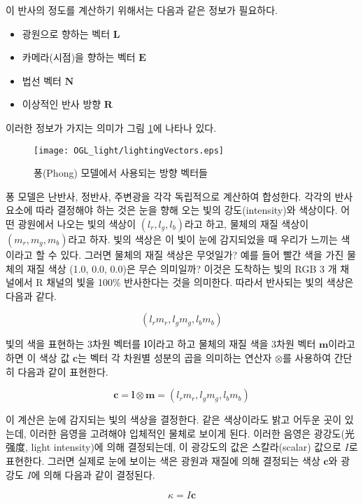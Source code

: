 이 반사의 정도를 계산하기 위해서는 다음과 같은 정보가 필요하다.

\begin{itemize}
\item 광원으로 향하는 벡터 $\mathbf L$
\item 카메라(시점)을 향하는 벡터 $\mathbf E$
\item 법선 벡터 $\mathbf N$
\item 이상적인 반사 방향 $\mathbf R$
\end{itemize}

이러한 정보가 가지는 의미가 그림 \ref{fig:OGL_light:lightingVectors}에 나타나 있다.

\begin{figure}[h!]
  \centering
    \texttt{[image: OGL\_light/lightingVectors.eps]}
    \caption{퐁(Phong) 모델에서 사용되는 방향 벡터들}
    \label{fig:OGL_light:lightingVectors}
\end{figure}

퐁 모델은 난반사, 정반사, 주변광을 각각 독립적으로 계산하여 합성한다. 각각의 반사 요소에 따라 결정해야 하는 것은 눈을 향해 오는 빛의 강도(intensity)와 색상이다. 
어떤 광원에서 나오는 빛의 색상이 $(l_r, l_g, l_b)$라고 하고, 물체의 재질 색상이 $(m_r, m_g, m_b)$라고 하자. 
빛의 색상은 이 빛이 눈에 감지되었을 때 우리가 느끼는 색이라고 할 수 있다. 그러면 물체의 재질 색상은 무엇일가? 예를 들어 빨간 색을 가진 물체의 
재질 색상 (1.0, 0.0, 0.0)은 무슨 의미일까? 이것은 도착하는 빛의 RGB 3 개 채널에서 R 채널의 빛을 100\% 반사한다는 것을 의미한다. 
따라서 반사되는 빛의 색상은 다음과 같다.

$$(l_r m_r, l_g m_g, l_b m_b)$$

빛의 색을 표현하는 3차원 벡터를 $\mathbf l$이라고 하고 물체의 재질 색을 3차원 벡터  $\mathbf m$이라고 하면 이 색상 값 $\mathbf c$는
벡터 각 차원별 성분의 곱을 의미하는 연산자 $\otimes$를 사용하여 간단히 다음과 같이 표현한다.

$$\mathbf c = \mathbf l \otimes \mathbf m = (l_r m_r, l_g m_g, l_b m_b) $$

이 계산은 눈에 감지되는 빛의 색상을 결정한다. 같은 색상이라도 밝고 어두운 곳이 있는데, 이러한 음영을 고려해야 입체적인 물체로 보이게 된다.
이러한 음영은 광강도(光强度, light intensity)에 의해 결정되는데, 이 광강도의 값은 스칼라(scalar) 값으로 $I$로 표현한다.
그러면 실제로 눈에 보이는 색은 광원과 재질에 의해 결정되는 색상 $\mathbf c$와 광강도 $I$에 의해 다음과 같이 결정된다.

$$\kappa = I \mathbf c$$

